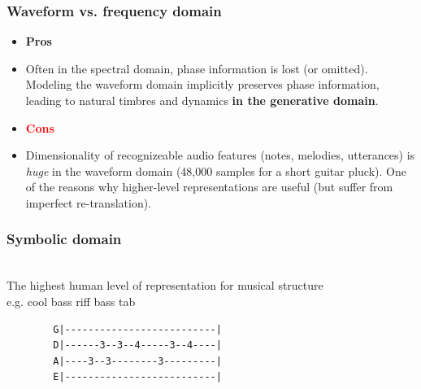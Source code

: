 \documentclass{beamer}
\begin{document}

\begin{frame}
	\frametitle{Waveform vs. frequency domain}
	\begin{itemize}
		\item[] \textbf{\textcolor{ao(english)}{Pros}}
		\item Often in the spectral domain, phase information is lost (or omitted). Modeling the waveform domain implicitly preserves phase information, leading to natural timbres and dynamics \textbf{in the generative domain}.
	\end{itemize}
	\vspace{1em}
	\begin{itemize}
		\item[] \textbf{\textcolor{red}{Cons}}
		\item Dimensionality of recognizeable audio features (notes, melodies, utterances) is \textit{huge} in the waveform domain (48,000 samples for a short guitar pluck). One of the reasons why higher-level representations are useful (but suffer from imperfect re-translation).
	\end{itemize}
\end{frame}


\begin{frame}[fragile]
	\frametitle{Symbolic domain}
	\ \\
	The highest human level of representation for musical structure\\
	e.g. cool bass riff bass tab 
	\begin{small}
		\begin{verbatim}
		G|--------------------------|
		D|------3--3--4-----3--4----|
		A|----3--3--------3---------|
		E|--------------------------|
		\end{verbatim}
	\end{small}
\end{frame}
\end{document}
